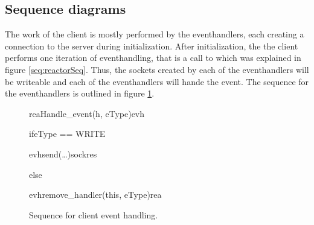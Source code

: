 \documentclass[Main]{subfiles}
\begin{document}
\subsection{Sequence diagrams}

The work of the client is mostly performed by the eventhandlers, each creating a connection to the server during initialization. After initialization, the the client performs one iteration of eventhandling, that is a call to  which was explained in figure \ref{seq:reactorSeq}. Thus, the sockets created by each of the eventhandlers will be writeable and each of the eventhandlers will hande the  event. The sequence for the eventhandlers is outlined in figure \ref{fig:clientEventHandler}.

\begin{figure}
\begin {sequencediagram}

	\begin{messcall}{rea}{Handle\_event(h, eType)}{evh}

		\begin{sdblock}{if}{eType == WRITE}
			\begin{call}{evh}{send(\dots)}{sock}{res}
			\end{call}

		\end{sdblock}

		\begin{sdblock}{else}{}
			\begin{call}{evh}{remove\_handler(this, eType)}{rea}{}
			\end{call}
		\end{sdblock}

	\end{messcall}



\end{sequencediagram}

\caption{Sequence for client event handling.}
\label{fig:clientEventHandler}
\end{figure}
\end{document}
